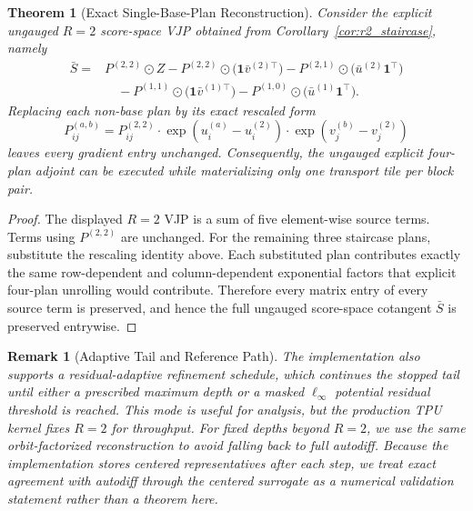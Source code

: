 \documentclass{article}
\newtheorem{theorem}{Theorem}
\newtheorem{remark}{Remark}
\begin{document}
\begin{theorem}[Exact Single-Base-Plan Reconstruction]\label{thm:single-base-plan}
Consider the explicit ungauged $R=2$ score-space VJP obtained from Corollary~\ref{cor:r2_staircase}, namely
\begin{align}
    \bar S
    ={}&
    P^{(2,2)} \odot Z
    - P^{(2,2)} \odot \bigl(\mathbf{1}\bar v^{(2)\top}\bigr)
    - P^{(2,1)} \odot \bigl(\bar u^{(2)}\mathbf{1}^\top\bigr) \nonumber\\
    &\quad
    - P^{(1,1)} \odot \bigl(\mathbf{1}\bar v^{(1)\top}\bigr)
    - P^{(1,0)} \odot \bigl(\bar u^{(1)}\mathbf{1}^\top\bigr).
\end{align}
Replacing each non-base plan by its exact rescaled form
\begin{equation}
    P^{(a,b)}_{ij} = P^{(2,2)}_{ij} \cdot \exp(u^{(a)}_i-u^{(2)}_i) \cdot \exp(v^{(b)}_j-v^{(2)}_j)
\end{equation}
leaves every gradient entry unchanged. Consequently, the ungauged explicit four-plan adjoint can be executed while materializing only one transport tile per block pair.
\end{theorem}

\begin{proof}
The displayed $R=2$ VJP is a sum of five element-wise source terms. Terms using $P^{(2,2)}$ are unchanged. For the remaining three staircase plans, substitute the rescaling identity above. Each substituted plan contributes exactly the same row-dependent and column-dependent exponential factors that explicit four-plan unrolling would contribute. Therefore every matrix entry of every source term is preserved, and hence the full ungauged score-space cotangent $\bar S$ is preserved entrywise.
\end{proof}

\begin{remark}[Adaptive Tail and Reference Path]
The implementation also supports a residual-adaptive refinement schedule, which continues the stopped tail until either a prescribed maximum depth or a masked $\ell_\infty$ potential residual threshold is reached. This mode is useful for analysis, but the production TPU kernel fixes $R=2$ for throughput. For fixed depths beyond $R=2$, we use the same orbit-factorized reconstruction to avoid falling back to full autodiff. Because the implementation stores centered representatives after each step, we treat exact agreement with autodiff through the centered surrogate as a numerical validation statement rather than a theorem here.
\end{remark}
\end{document}
